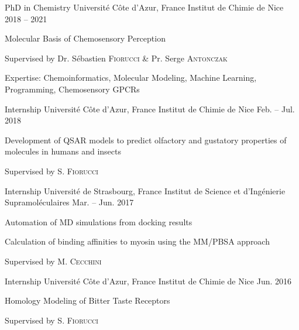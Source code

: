 \vspace{-1em}

\begin{minipage}[t]{.49\linewidth}
% 
    \begin{cventries}
% 
        \cventryvar
            {PhD in Chemistry}
            {Université Côte d'Azur, France}
            {Institut de Chimie de Nice}
            {2018 -- 2021}
            {
            \begin{cvitems}
                \item{Molecular Basis of Chemosensory Perception}
                \item{Supervised by Dr. Sébastien \textsc{Fiorucci} \& Pr. Serge \textsc{Antonczak}}
                \item{Expertise: Chemoinformatics, Molecular Modeling, Machine Learning, Programming, Chemosensory GPCRs}
            \end{cvitems}
            }
% 
        \cventryvar
            {Internship}
            {Université Côte d'Azur, France}
            {Institut de Chimie de Nice}
            {Feb. -- Jul. 2018}
            {
            \begin{cvitems}
                \item{Development of QSAR models to predict olfactory and gustatory \mbox{properties} of molecules in humans and insects}
                \item{Supervised by S. \textsc{Fiorucci}}
            \end{cvitems}
            }

        \cventryvar
            {Internship}
            {Université de Strasbourg, France}
            {Institut de Science et d'Ingénierie Supramoléculaires}
            {Mar. -- Jun. 2017}
            {
            \begin{cvitems}
                \item{Automation of MD simulations from docking results}
                \item{Calculation of binding affinities to myosin using the MM/PBSA \mbox{approach}}
                \item{Supervised by M. \textsc{Cecchini}}
            \end{cvitems}
            }
% 
        \cventryvar
            {Internship}
            {Université Côte d'Azur, France}
            {Institut de Chimie de Nice}
            {Jun. 2016}
            {
            \begin{cvitems}
                \item{Homology Modeling of Bitter Taste Receptors}
                \item{Supervised by S. \textsc{Fiorucci}}
            \end{cvitems}
            }
% 
    \end{cventries}
% 
\end{minipage}
